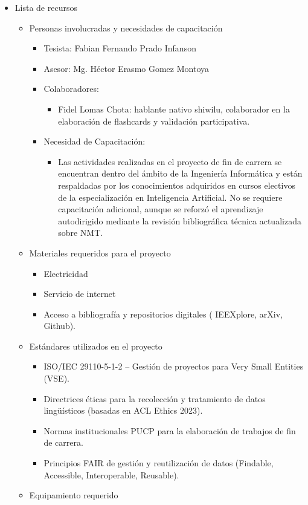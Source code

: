 \documentclass[12pt,a4paper,oneside]{book}
\begin{document}
\begin{itemize}
\item
  Lista de recursos

  \begin{itemize}
  \item
    Personas involucradas y necesidades de capacitación

    \begin{itemize}
    \item
      Tesista: Fabian Fernando Prado Infanson
    \item
      Asesor: Mg. Héctor Erasmo Gomez Montoya
    \item
      Colaboradores:

      \begin{itemize}
      \item
        Fidel Lomas Chota: hablante nativo shiwilu, colaborador en la elaboración de flashcards y validación participativa.
      \end{itemize}
    \item
      Necesidad de Capacitación:

      \begin{itemize}
      \item
        Las actividades realizadas en el proyecto de fin de carrera se encuentran dentro del ámbito de la Ingeniería Informática y están respaldadas por los conocimientos adquiridos en cursos electivos de la especialización en Inteligencia Artificial. No se requiere capacitación adicional, aunque se reforzó el aprendizaje autodirigido mediante la revisión bibliográfica técnica actualizada sobre NMT.
      \end{itemize}
    \end{itemize}
  \item
    Materiales requeridos para el proyecto

    \begin{itemize}
    \item
      Electricidad
    \item
      Servicio de internet
    \item
      Acceso a bibliografía y repositorios digitales ( IEEXplore, arXiv, Github).
    \end{itemize}
  \item
    Estándares utilizados en el proyecto

    \begin{itemize}
    \item
      ISO/IEC 29110-5-1-2 -- Gestión de proyectos para Very Small Entities (VSE).
    \item
      Directrices éticas para la recolección y tratamiento de datos lingüísticos (basadas en ACL Ethics 2023).
    \item
      Normas institucionales PUCP para la elaboración de trabajos de fin de carrera.
    \item
      Principios FAIR de gestión y reutilización de datos (Findable, Accessible, Interoperable, Reusable).
    \end{itemize}
  \item
    Equipamiento requerido


\end{itemize}
\end{itemize}
\end{document}
